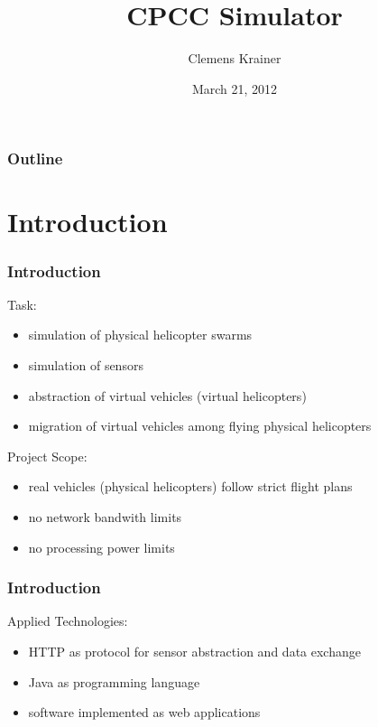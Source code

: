 \documentclass{beamer}
\title{CPCC Simulator}
\author{Clemens Krainer}
\institute[University of Salzburg]
{
Department of Computer Sciences\\
University of Salzburg, Austria
}
\date{March 21, 2012}
\begin{document}
\begin{frame}
	\titlepage
\end{frame}

\begin{frame}
	\frametitle{Outline}
	\tableofcontents
\end{frame}


\section{Introduction}


\begin{frame}\frametitle{Introduction} %
Task:
        \begin{itemize}
                \item simulation of physical helicopter swarms
                \item simulation of sensors
                \item abstraction of virtual vehicles (virtual helicopters)
                \item migration of virtual vehicles among flying physical helicopters
        \end{itemize}
\pause
\vspace{0.5cm}
Project Scope:
        \begin{itemize}
                \item real vehicles (physical helicopters) follow strict flight plans
                \item no network bandwith limits
                \item no processing power limits
        \end{itemize}
\end{frame}


\begin{frame}\frametitle{Introduction}
Applied Technologies:
        \begin{itemize}
                \item HTTP as protocol for sensor abstraction and data exchange
                \item Java as programming language
                \item software implemented as web applications
        \end{itemize}
\end{frame}
\end{document}
